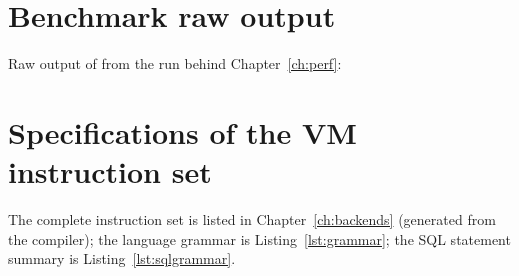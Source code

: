 

\chapter{Benchmark raw output}\label{app:bench}
Raw output of  from the run behind Chapter~\ref{ch:perf}:



\chapter{Specifications of the VM instruction set}
The complete instruction set is listed in Chapter~\ref{ch:backends} (generated from the compiler); the language grammar is Listing~\ref{lst:grammar}; the SQL statement summary is Listing~\ref{lst:sqlgrammar}.
